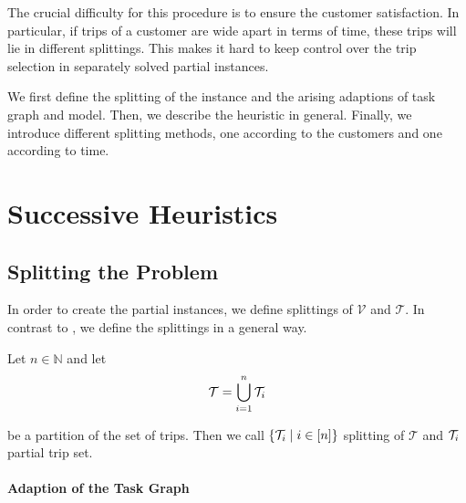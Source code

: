 The crucial difficulty for this procedure is to ensure the customer satisfaction. In particular, if trips of a customer are wide apart in terms of time, these trips will lie in different splittings. This makes it hard to keep control over the trip selection in separately solved partial instances.

We first define the splitting of the instance and the arising adaptions of task graph and model. Then, we describe the heuristic in general. Finally, we introduce different splitting methods, one according to the customers and one according to time. 


\section{Successive Heuristics}

\subsection{Splitting the Problem}

In order to create the partial instances, we define splittings of $\mathcal{V}$ and $\mathcal{T}$. In contrast to \cite{Knoll}, we define the splittings in a general way.

\begin{definition}[Splitting]
\label{def:splitting}

Let $n\in\mathbb{N}$ and let
\begin{align*}
	\mathcal{T}=\bigcup_{i=1}^n\mathcal{T}_i
\end{align*}

be a partition of the set of trips. Then we call $\left\{\mathcal{T}_i\mid i\in[n]\right\}$ splitting of $\mathcal{T}$ and $\mathcal{T}_i$ partial trip set.

\end{definition}

\paragraph{Adaption of the Task Graph} \parfill

